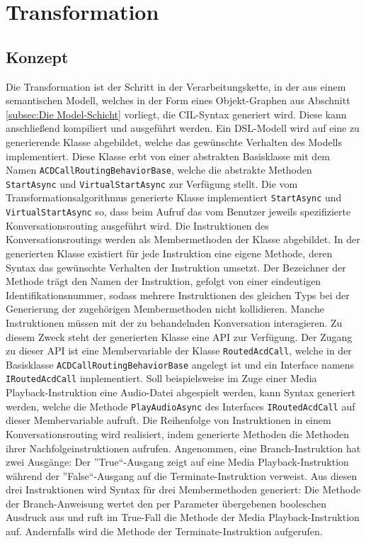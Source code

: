 \section{Transformation}
\label{sec:Transformation}

\subsection{Konzept}
\label{subsec:Konzept}
Die Transformation ist der Schritt in der Verarbeitungskette, in der aus einem semantischen Modell, welches in der Form eines Objekt-Graphen aus Abschnitt \ref{subsec:Die Model-Schicht} vorliegt, die CIL-Syntax generiert wird. Diese kann anschließend kompiliert und ausgeführt werden. Ein DSL-Modell wird auf eine zu generierende Klasse abgebildet, welche das gewünschte Verhalten des Modells implementiert. Diese Klasse erbt von einer abstrakten Basisklasse mit dem Namen \texttt{ACDCallRoutingBehaviorBase}, welche die abstrakte Methoden \texttt{StartAsync} und \texttt{VirtualStartAsync} zur Verfügung stellt. Die vom Transformationsalgorithmus generierte Klasse implementiert \texttt{Start\-Async} und \texttt{VirtualStartAsync} so, dass beim Aufruf das vom Benutzer jeweils spezifizierte Konversationsrouting ausgeführt wird.
\newline 
Die Instruktionen des Konversationsroutings werden als Membermethoden der Klasse abgebildet. In der generierten Klasse existiert für jede Instruktion eine eigene Methode, deren Syntax das gewünschte Verhalten der Instruktion umsetzt. Der Bezeichner der Methode trägt den Namen der Instruktion, gefolgt von einer eindeutigen Identifikationsnummer, sodass mehrere Instruktionen des gleichen Typs bei der Generierung der zugehörigen Membermethoden nicht kollidieren. Manche Instruktionen müssen mit der zu behandelnden Konversation interagieren. Zu diesem Zweck steht der generierten Klasse eine API zur Verfügung. Der Zugang zu  dieser API ist eine Membervariable der Klasse \texttt{RoutedAcdCall}, welche in der Basisklasse \texttt{ACDCallRoutingBehaviorBase} angelegt ist und ein Interface namens \texttt{IRoutedAcdCall} implementiert. Soll beispielsweise im Zuge einer Media Playback-Instruktion eine Audio-Datei abgespielt werden, kann Syntax generiert werden, welche die Methode \texttt{PlayAudioAsync} des Interfaces \texttt{IRoutedAcdCall} auf dieser Membervariable aufruft. 
\newline
Die Reihenfolge von Instruktionen in einem Konversationsrouting wird realisiert, indem generierte Methoden die Methoden ihrer Nachfolgeinstruktionen aufrufen. Angenommen, eine Branch-Instruktion hat zwei Ausgänge: Der ''True``-Ausgang zeigt auf eine Media Playback-Instruktion während der ''False``-Ausgang auf die Terminate-Instruktion verweist. Aus diesen drei Instruktionen wird Syntax für drei Membermethoden generiert: Die Methode der Branch-Anweisung wertet den per Parameter übergebenen booleschen Ausdruck aus und ruft im True-Fall die Methode der Media Playback-Instruktion auf. Andernfalls wird die Methode der Terminate-Instruktion aufgerufen. 
